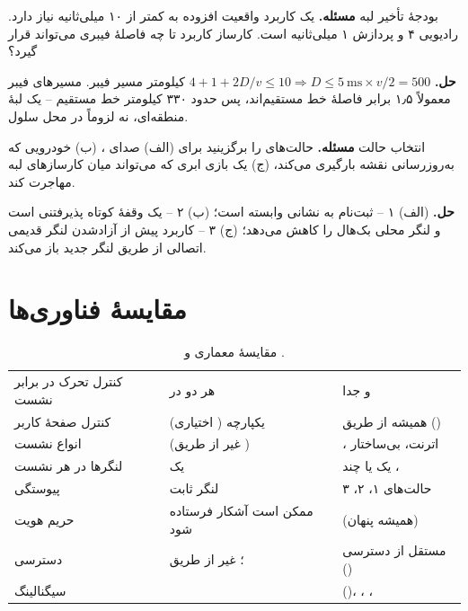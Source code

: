 \documentclass[11pt,a4paper]{article}
\begin{document}
\begin{examplebox}{بودجهٔ تأخیر لبه}\label{ex:edge}
\textbf{مسئله.} یک کاربرد واقعیت افزوده به  کمتر از ۱۰ میلی‌ثانیه نیاز دارد.  رادیویی ۴ و پردازش ۱ میلی‌ثانیه است.
کارساز کاربرد تا چه فاصلهٔ فیبری می‌تواند قرار گیرد؟

\textbf{حل.} $4 + 1 + 2D/v \le 10 \Rightarrow D \le 5\ \text{ms}\times v/2 = 500$ کیلومتر مسیر فیبر. مسیرهای فیبر معمولاً ۱٫۵ برابر
فاصلهٔ خط مستقیم‌اند، پس حدود ۳۳۰ کیلومتر خط مستقیم -- یک لبهٔ منطقه‌ای، نه لزوماً در محل سلول.
\end{examplebox}

\begin{examplebox}{انتخاب حالت }\label{ex:ssc}
\textbf{مسئله.} حالت‌های  را برگزینید برای (الف) صدای ، (ب) خودرویی که به‌روزرسانی نقشه بارگیری می‌کند، (ج) یک
بازی ابری که می‌تواند میان کارسازهای لبه مهاجرت کند.

\textbf{حل.} (الف)  ۱ -- ثبت‌نام  به نشانی  وابسته است؛ (ب)  ۲ -- یک وقفهٔ کوتاه پذیرفتنی است و
لنگر محلی بک‌هال را کاهش می‌دهد؛ (ج)  ۳ -- کاربرد پیش از آزادشدن لنگر قدیمی اتصالی از طریق لنگر جدید باز می‌کند.
\end{examplebox}

\section{مقایسهٔ فناوری‌ها}
\begin{table}[htbp]
\centering\small
\caption{مقایسهٔ معماری  و .}\label{tab:cmp}
\begin{tabularx}{\linewidth}{@{}l Y Y@{}}
\toprule
{} &  &  \\
\midrule
کنترل تحرک در برابر نشست & هر دو در               &  و  جدا \\
کنترل صفحهٔ کاربر   & یکپارچه ( اختیاری)        & همیشه از طریق  () \\
انواع نشست         &  (غیر از طریق ) & ، اترنت، بی‌ساختار \\
لنگرها در هر نشست  & یک                           & یک یا چند ،  \\
پیوستگی            & لنگر ثابت                             & حالت‌های  ۱، ۲، ۳ \\
حریم هویت          &  ممکن است آشکار فرستاده شود &  (همیشه پنهان) \\
دسترسی             & ؛ غیر از طریق  &  مستقل از دسترسی () \\
سیگنالینگ          &                 &  ()، ، ،  \\
\bottomrule
\end{tabularx}
\end{table}
\end{document}
